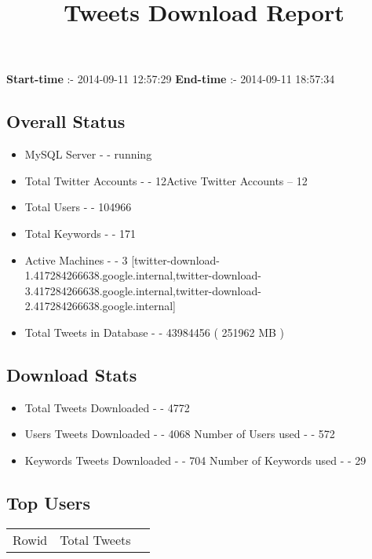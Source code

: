 \documentclass{article}\usepackage[T1]{fontenc}
\begin{document}
\title{\textbf{Tweets Download Report}}
               \date{}
                \maketitle
               \centerline{\textbf{Start-time} :- 2014-09-11 12:57:29 \hspace{40pt} \textbf{End-time} :- 2014-09-11 18:57:34}               \subsection*{Overall Status}                \begin{itemize}                \item MySQL Server - - running               \item Total Twitter Accounts - - 12\newline Active Twitter Accounts -- 12               \item Total Users - - 104966               \item Total Keywords - - 171               \item Active Machines - - 3 [twitter-download-1.417284266638.google.internal,twitter-download-3.417284266638.google.internal,twitter-download-2.417284266638.google.internal]               \item Total Tweets in Database - - 43984456 ( 251962 MB )               \end{itemize}               \subsection*{Download Stats}                \begin{itemize}                \item Total Tweets Downloaded - - 4772               \item Users Tweets Downloaded - - 4068 \newline Number of Users used - - 572               \item Keywords Tweets Downloaded - - 704 \newline Number of Keywords used - - 29              \end{itemize}              \subsection*{Top Users}\begin{tabular}{|c|c|c|}         \hline         Rowid & Total Tweets \\ 

\end{tabular}
\end{document}
